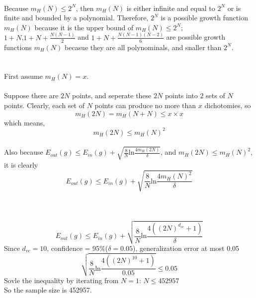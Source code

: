 \documentclass[11pt]{article}
\begin{document}
\newpage
{}\\
Because $m_H(N)\leq 2^N$, then $m_H(N)$ is either infinite and equal to $2^N$ or is finite and bounded by a polynomial.
Therefore, $2^N$ is a possible growth function $m_H(N)$ because it is the upper bound of $m_H(N)\leq 2^N$;\\
$1+N$,$1+N+\frac{N(N-1)}{2}$ and $1+N+\frac{N(N-1)(N-2)}{6}$ are possible growth functions $m_H(N)$ becasue they are all polynominals, and snaller than $2^N$.
\\
\\
\\
First assume $m_H(N)=x$.\\\\
Suppose there are $2N$ points, and seperate these $2N$ points into 2 sets of $N$ points. Clearly, each set of $N$ points can produce no more than $x$ dichotomies, so\[m_H(2N)=m_H(N+N)\leq x\times x\]
which means,\[
m_H(2N)\leq m_H(N)^2
\]
\\
Also because $E_{out}(g)\leq E_{in}(g)+\sqrt{\frac{8}{N}\text{ln}\frac{4m_H(2N)}{\delta}}$, and $m_H(2N)\leq m_H(N)^2$,
it is clearly\[
E_{out}(g)\leq E_{in}(g)+\sqrt{\frac{8}{N}\text{ln}\frac{4m_H(N)^2}{\delta}}
\]
\\
\\
\\
\[
E_{out}(g)\leq E_{in}(g)+\sqrt{\frac{8}{N}\text{ln}\frac{4((2N)^{d_{vc}}+1)}{\delta}}
\]
Since $d_{vc}=10$, confidence = 95\%($\delta =0.05$), generalization error at most 0.05
\[
\sqrt{\frac{8}{N}\text{ln}\frac{4((2N)^{10}+1)}{0.05}} \leq 0.05
\]
Sovle the inequality by iterating from $N = 1$:
 $N\leq 452957$\\
So the sample size is 452957.

\newpage
\end{document}
